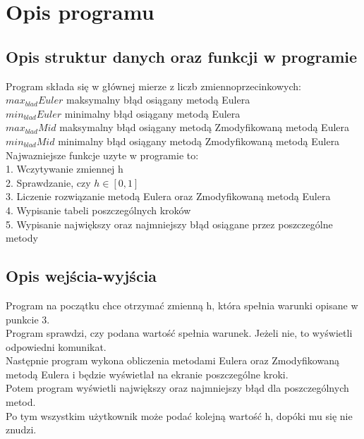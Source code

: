 \documentclass[10pt]{article} %
\begin{document}
\section{Opis programu}
\subsection{Opis struktur danych oraz funkcji w programie}
Program składa się w głównej mierze z liczb zmiennoprzecinkowych:\\
$max_{blad}Euler$ maksymalny błąd osiągany metodą Eulera\\
$min_{blad}Euler$ minimalny błąd osiągany metodą Eulera\\
$max_{blad}Mid$ maksymalny błąd osiągany metodą Zmodyfikowaną metodą Eulera\\
$min_{blad}Mid$ minimalny błąd osiągany metodą Zmodyfikowaną metodą Eulera\\
Najwazniejsze funkcje uzyte w programie to:\\
1. Wczytywanie zmiennej h\\
2. Sprawdzanie, czy $h \in [0,1]$\\
3. Liczenie rozwiązanie metodą Eulera oraz Zmodyfikowaną metodą Eulera\\
4. Wypisanie tabeli poszczególnych kroków\\
5. Wypisanie największy oraz najmniejszy błąd osiągane przez poszczególne metody\\
\subsection{Opis wejścia-wyjścia}
Program na początku chce otrzymać zmienną h, która spełnia warunki opisane w punkcie 3.\\
Program sprawdzi, czy podana wartość spełnia warunek. Jeżeli nie, to wyświetli odpowiedni komunikat.\\
Następnie program wykona obliczenia metodami Eulera oraz Zmodyfikowaną metodą Eulera i będzie wyświetlał na ekranie poszczególne kroki.\\
Potem program wyświetli największy oraz najmniejszy błąd dla poszczególnych metod.\\
Po tym wszystkim użytkownik może podać kolejną wartość h, dopóki mu się nie znudzi.\\
\end{document}
